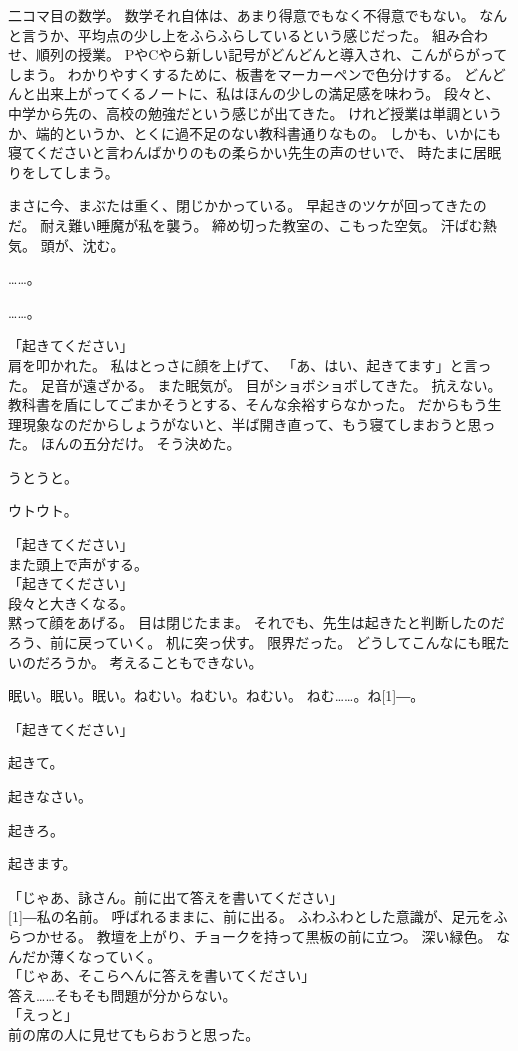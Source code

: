 \documentclass[../IHMain]{subfiles}
\begin{document}
二コマ目の数学。
数学それ自体は、あまり得意でもなく不得意でもない。
なんと言うか、平均点の少し上をふらふらしているという感じだった。
組み合わせ、順列の授業。
PやCやら新しい記号がどんどんと導入され、こんがらがってしまう。
わかりやすくするために、板書をマーカーペンで色分けする。
どんどんと出来上がってくるノートに、私はほんの少しの満足感を味わう。
段々と、中学から先の、高校の勉強だという感じが出てきた。
けれど授業は単調というか、端的というか、とくに過不足のない教科書通りなもの。
しかも、いかにも寝てくださいと言わんばかりのもの柔らかい先生の声のせいで、
時たまに居眠りをしてしまう。

まさに今、まぶたは重く、閉じかかっている。
早起きのツケが回ってきたのだ。
耐え難い睡魔が私を襲う。
締め切った教室の、こもった空気。
汗ばむ熱気。
頭が、沈む。

……。

……。

「起きてください」\\
肩を叩かれた。
私はとっさに顔を上げて、
「あ、はい、起きてます」と言った。
足音が遠ざかる。
また眠気が。
目がショボショボしてきた。
抗えない。
教科書を盾にしてごまかそうとする、そんな余裕すらなかった。
だからもう生理現象なのだからしょうがないと、半ば開き直って、もう寝てしまおうと思った。
ほんの五分だけ。
そう決めた。

うとうと。

ウトウト。

「起きてください」\\
また頭上で声がする。\\
「起きてください」\\
段々と大きくなる。\\
黙って顔をあげる。
目は閉じたまま。
それでも、先生は起きたと判断したのだろう、前に戻っていく。
机に突っ伏す。
限界だった。
どうしてこんなにも眠たいのだろうか。
考えることもできない。

眠い。眠い。眠い。ねむい。ねむい。ねむい。
ねむ……。ね\scalebox{3}[1]{―}。

「起きてください」

起きて。

起きなさい。

起きろ。

起きます。

「じゃあ、詠さん。前に出て答えを書いてください」\\
\scalebox{3}[1]{―}私の名前。
呼ばれるままに、前に出る。
ふわふわとした意識が、足元をふらつかせる。
教壇を上がり、チョークを持って黒板の前に立つ。
深い緑色。
なんだか薄くなっていく。\\
「じゃあ、そこらへんに答えを書いてください」\\
答え……そもそも問題が分からない。\\
「えっと」\\
前の席の人に見せてもらおうと思った。
\end{document}
